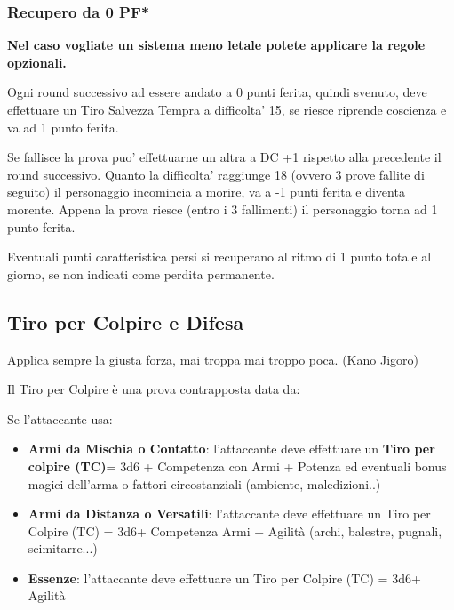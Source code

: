 \documentclass[a4paper,11pt,twoside,openany]{book}
\begin{document}
\subsubsection{Recupero da 0 PF*}  

\textbf{Nel caso vogliate un sistema meno letale potete applicare la regole opzionali.}

Ogni round successivo ad essere andato a 0 punti ferita, quindi svenuto, deve effettuare un Tiro Salvezza Tempra a difficolta’ 15, se riesce riprende coscienza e va ad 1 punto ferita.

Se fallisce la prova puo’ effettuarne un altra a DC +1 rispetto alla precedente il round successivo. Quanto la difficolta’ raggiunge 18 (ovvero 3 prove fallite di seguito) il personaggio incomincia a morire, va a -1 punti ferita e diventa morente.
Appena la prova riesce (entro i 3 fallimenti) il personaggio torna ad 1 punto ferita.

Eventuali punti caratteristica persi si recuperano al ritmo di 1 punto totale al giorno, se non indicati come perdita permanente.

\pagebreak

\subsection{Tiro per Colpire e Difesa}

\label{tiro-per-colpire}
\begin{tcolorbox}[enhanced,arc=5pt,boxrule=0.3pt]{Applica sempre la giusta forza, mai troppa mai troppo poca. (Kano Jigoro)}\end{tcolorbox}\medskip

Il Tiro per Colpire è una prova contrapposta data da:

Se l'attaccante usa:

\begin{itemize}
	\item \textbf{Armi da Mischia o Contatto}: l'attaccante deve effettuare un \textbf{Tiro per colpire (TC)}= 3d6 + Competenza con Armi + Potenza ed eventuali bonus magici dell'arma o fattori circostanziali (ambiente, maledizioni..)
	\item
	      \textbf{Armi da Distanza o Versatili}: l'attaccante deve effettuare un Tiro per Colpire (TC) = 3d6+ Competenza Armi + Agilità (archi, balestre, pugnali, scimitarre...)
	\item	\textbf{Essenze}: l'attaccante deve effettuare un Tiro per Colpire (TC) = 3d6+ Agilità
\end{itemize}
\end{document}
